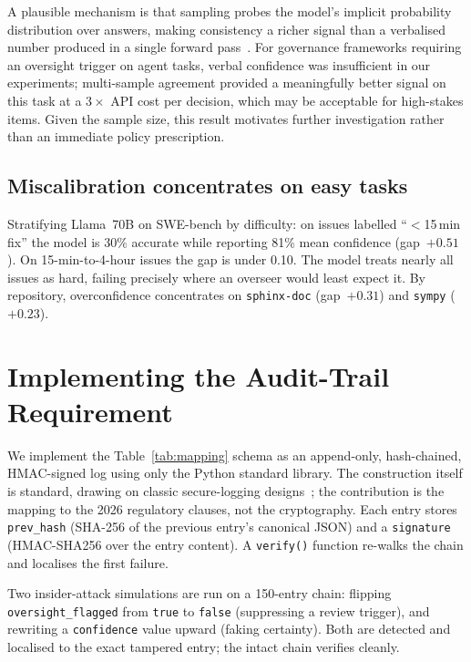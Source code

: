 \documentclass[10pt,twocolumn]{article}
\begin{document}
A plausible mechanism is that sampling probes the model's implicit probability
distribution over answers, making consistency a richer signal than a verbalised
number produced in a single forward pass~\citep{manakul2023,kuhn2023}. For
governance frameworks requiring an oversight trigger on agent tasks, verbal
confidence was insufficient in our experiments; multi-sample agreement provided
a meaningfully better signal on this task at a $3\times$ API cost per decision,
which may be acceptable for high-stakes items. Given the sample size, this
result motivates further investigation rather than an immediate policy
prescription.

\subsection{Miscalibration concentrates on easy tasks}

Stratifying Llama~70B on SWE-bench by difficulty: on issues labelled
``$<$15\,min fix'' the model is 30\% accurate while reporting 81\% mean
confidence (gap~$+0.51$). On 15-min-to-4-hour issues the gap is under 0.10.
The model treats nearly all issues as hard, failing precisely where an overseer
would least expect it. By repository, overconfidence concentrates on
\texttt{sphinx-doc} (gap~$+0.31$) and \texttt{sympy} ($+0.23$).

\section{Implementing the Audit-Trail Requirement}

We implement the Table~\ref{tab:mapping} schema as an append-only,
hash-chained, HMAC-signed log using only the Python standard library. The
construction itself is standard, drawing on classic secure-logging
designs~\citep{bellareyee1997,schneierkelsey1998,crosbywallach2009}; the
contribution is the mapping to the 2026 regulatory clauses, not the
cryptography. Each entry stores
\texttt{prev\_hash} (SHA-256 of the previous entry's canonical JSON) and a
\texttt{signature} (HMAC-SHA256 over the entry content). A \texttt{verify()}
function re-walks the chain and localises the first failure.

Two insider-attack simulations are run on a 150-entry chain: flipping
\texttt{oversight\_flagged} from \texttt{true} to \texttt{false} (suppressing a
review trigger), and rewriting a \texttt{confidence} value upward (faking
certainty). Both are detected and localised to the exact tampered entry; the
intact chain verifies cleanly.
\end{document}
